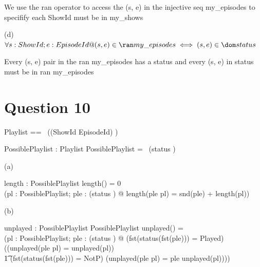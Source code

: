 \documentclass[a4paper,10pt,fleqn]{article}
\begin{document}
\bigskip


\bigskip

\setlength{\leftskip}{\dimexpr\parindent+2em\relax}
\noindent We use the ran operator to access the (s, e) in the injective seq my\_episodes to specifify each ShowId must be in my\_shows

\bigskip

\setlength{\leftskip}{0pt}
\medskip

\noindent\hspace*{\parindent}(d) $\forall s : ShowId; e : EpisodeId @ (s, e) \in \ran my\_episodes \iff (s, e) \in \dom status$

\bigskip

\setlength{\leftskip}{\dimexpr\parindent+2em\relax}
\noindent Every (s, e) pair in the ran my\_episodes has a status and every (s, e) in status must be in ran my\_episodes

\bigskip

\setlength{\leftskip}{0pt}
\section*{Question 10}

\begin{zed}
Playlist == \seq~((ShowId \cross EpisodeId) \cross \nat)
\end{zed}

\begin{axdef}
PossiblePlaylist : \power Playlist
\where
PossiblePlaylist = \seq~(\dom status \cross \nat)
\end{axdef}

\noindent\hspace*{\parindent}(a) \begin{axdef}
length : PossiblePlaylist \fun \nat
\where
length(\langle \rangle) = 0 \land \\
\quad (\forall pl : PossiblePlaylist; ple : (\dom status \cross \nat) @ length(\langle ple \rangle \cat pl) = snd(ple) + length(pl))
\end{axdef}

\medskip

\noindent\hspace*{\parindent}(b) \begin{axdef}
unplayed : PossiblePlaylist \fun PossiblePlaylist
\where
unplayed(\langle \rangle) = \langle \rangle \land \\
\quad (\forall pl : PossiblePlaylist; ple : (\dom status \cross \nat) @ (fst(status(fst(ple))) = Played) \implies ((unplayed(\langle ple \rangle \cat pl) = unplayed(pl)) \land \\
\t1 (fst(status(fst(ple))) = NotP) \implies (unplayed(\langle ple \rangle \cat pl) = \langle ple \rangle \cat unplayed(pl))))
\end{axdef}
\end{document}
